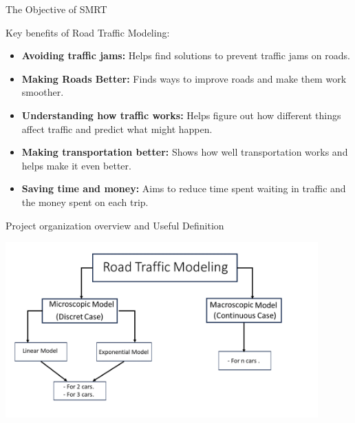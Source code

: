 \documentclass{beamer}
\begin{document}
\begin{frame}{The Objective of SMRT}
	\begin{block}{Key benefits of Road Traffic Modeling:}
		\begin{itemize}
	\item \textbf{Avoiding traffic jams:} Helps find solutions to prevent traffic jams on roads.
	\item \textbf{Making Roads Better:} Finds ways to improve roads and make them work smoother.
	\item \textbf{Understanding how traffic works:} Helps figure out how different things affect traffic and predict what might happen.
	\item \textbf{Making transportation better:} Shows how well transportation works and helps make it even better.
	\item \textbf{Saving time and money:} Aims to reduce time spent waiting in traffic and the money spent on each trip.
\end{itemize}
	\end{block}
\end{frame}

\begin{frame}{Project organization overview and Useful Definition}
	\begin{center}
    	\includegraphics[width=0.9\textwidth]{org1.png} 
    \end{center}
\end{frame}
\end{document}
